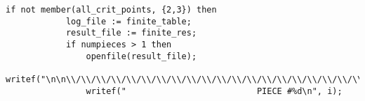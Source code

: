 \documentclass[a4paper,10pt]{article}
\begin{document}
\begin{lstlisting}[name=main]
        if not member(all_crit_points, {2,3}) then
            log_file := finite_table;
            result_file := finite_res;
            if numpieces > 1 then
                openfile(result_file);
                writef("\n\n\\/\\/\\/\\/\\/\\/\\/\\/\\/\\/\\/\\/\\/\\/\\/\\/\\/\\/\\/\\/\\/\\/\\/\\/\\/\\/\\/\\/\\/\\/\\/\\/\\/\\/\\/\\/\\/\\/\\/\\/\n");
                writef("                          PIECE #%d\n", i);

\end{lstlisting}
\end{document}
